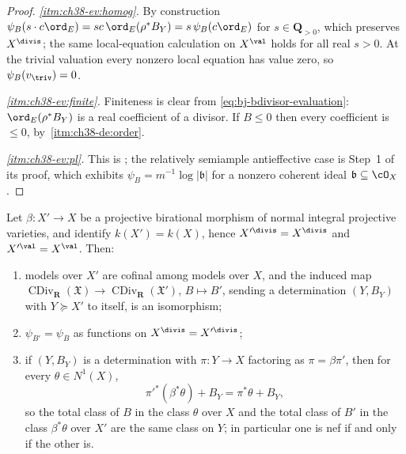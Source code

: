 \begin{proof}
\emph{\cref{itm:ch38-ev:homog}.}  By construction
$\psi_B(s\cdot c\ord_E)=sc\,\ord_E(\rho^*B_Y)=s\,\psi_B(c\ord_E)$ for
$s\in\mathbf Q_{>0}$, which preserves $X^{\divis}$; the same
local-equation calculation on $X^{\val}$ holds for all real $s>0$.
At the trivial valuation every nonzero local equation has value zero,
so $\psi_B(v_{\triv})=0$.

\emph{\cref{itm:ch38-ev:finite}.}  Finiteness is clear from
\eqref{eq:bj-bdivisor-evaluation}: $\ord_E(\rho^*B_Y)$ is a real
coefficient of a divisor.  If $B\leq0$ then every coefficient is
$\leq0$, by
\,\cref{itm:ch38-de:order}.

\emph{\cref{itm:ch38-ev:pl}.}  This is
; the relatively semiample antieffective
case is Step~1 of its proof, which exhibits
$\psi_B=m^{-1}\log|\mathfrak b|$ for a nonzero coherent ideal
$\mathfrak b\subseteq\cO_X$.
\end{proof}

\begin{proposition}
\label{prop:ch38-evaluation-functorial}
Let $\beta:X'\to X$ be a projective birational morphism of normal
integral projective varieties, and identify $k(X')=k(X)$, hence
$X'^{\divis}=X^{\divis}$ and $X'^{\val}=X^{\val}$.  Then:
\begin{enumerate}
\item\label{itm:ch38-fun:cofinal} models over $X'$ are cofinal among
 models over $X$, and the induced map
 $\operatorname{CDiv}_{\mathbf R}(\mathfrak X)
 \to\operatorname{CDiv}_{\mathbf R}(\mathfrak X')$,
 $B\mapsto B'$, sending a determination $(Y,B_Y)$ with $Y\succeq X'$
 to itself, is an isomorphism;
\item\label{itm:ch38-fun:psi} $\psi_{B'}=\psi_B$ as functions on
 $X^{\divis}=X'^{\divis}$;
\item\label{itm:ch38-fun:class} if $(Y,B_Y)$ is a determination with
 $\pi:Y\to X$ factoring as $\pi=\beta\pi'$, then for every
 $\theta\in N^1(X)$,
\[
 \pi'^*(\beta^*\theta)+B_Y=\pi^*\theta+B_Y,
\tag{38.3}\label{eq:ch38-functorial-total}
\]
 so the total class of $B$ in the class $\theta$ over $X$ and the
 total class of $B'$ in the class $\beta^*\theta$ over $X'$ are the
 same class on $Y$; in particular one is nef if and only if the other
 is.
\end{enumerate}
\end{proposition}


